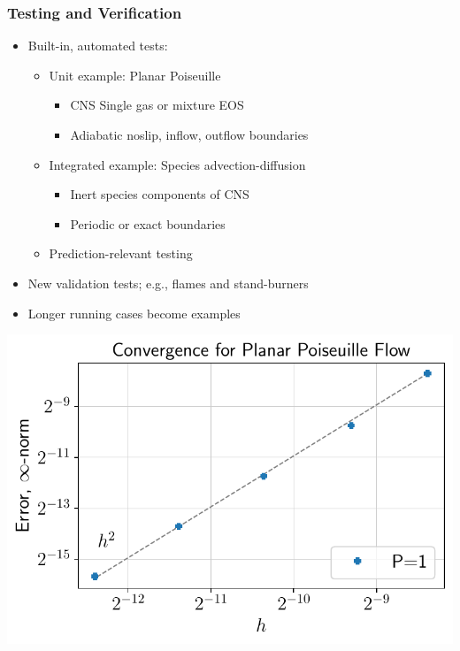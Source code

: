 \begin{frame}\frametitle{Testing and Verification}
\begin{multicols}{2}
  \begin{itemize}
  \item Built-in, automated tests:
    \begin{itemize}
    \item Unit example: Planar Poiseuille
    \begin{itemize}
    \item CNS Single gas or mixture EOS
    \item Adiabatic noslip, inflow, outflow boundaries
    \end{itemize}
    \item Integrated example: Species advection-diffusion
    \begin{itemize}
    \item Inert species components of CNS
    \item Periodic or exact boundaries
    \end{itemize}
    \item Prediction-relevant testing 
    \end{itemize}
\item New validation tests; e.g., flames and stand-burners 
\item Longer running cases become examples
\end{itemize}
\columnbreak
\includegraphics[width=.35\textwidth]{Figures/mtc/poiseuille-convergence.pdf}

\end{multicols}
\end{frame}
